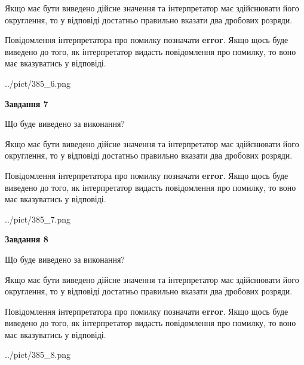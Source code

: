 \documentclass[12pt, ukrainian]{article}
\begin{document}
{\begin {Large}
Якщо має бути виведено дійсне значення та інтерпретатор має здійснювати його округлення, 
то у відповіді достатньо правильно вказати два дробових розряди.

Повідомлення інтерпретатора про помилку позначати \textbf{error}.
Якщо щось буде виведено до того, як інтерпретатор видасть повідомлення про помилку, 
то воно має вказуватись у відповіді. \par

\begin{center}
	{../pict/385_6.png}
\end{center}
\newpage

{\begin {center}\textbf{Завдання 7}\end {center}}\par
Що буде виведено за виконання? \par

Якщо має бути виведено дійсне значення та інтерпретатор має здійснювати його округлення, 
то у відповіді достатньо правильно вказати два дробових розряди.

Повідомлення інтерпретатора про помилку позначати \textbf{error}.
Якщо щось буде виведено до того, як інтерпретатор видасть повідомлення про помилку, 
то воно має вказуватись у відповіді. \par

\begin{center}
	{../pict/385_7.png}
\end{center}
\newpage

{\begin {center}\textbf{Завдання 8}\end {center}}\par
Що буде виведено за виконання? \par

Якщо має бути виведено дійсне значення та інтерпретатор має здійснювати його округлення, 
то у відповіді достатньо правильно вказати два дробових розряди.

Повідомлення інтерпретатора про помилку позначати \textbf{error}.
Якщо щось буде виведено до того, як інтерпретатор видасть повідомлення про помилку, 
то воно має вказуватись у відповіді. \par

\begin{center}
	{../pict/385_8.png}
\end{center}
\newpage


\end{Large}}
\end{document}
